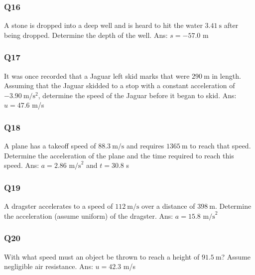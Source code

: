 \documentclass{article}
\begin{document}
\subsubsection{Q16}

A stone is dropped into a deep well and is heard to hit the water $3.41 \mathrm{~s}$ after being dropped. Determine the depth of the well.
\ifpaper Ans: $s=-57.0$ m \fi

\subsubsection{Q17}

It was once recorded that a Jaguar left skid marks that were $290 \mathrm{~m}$ in length. Assuming that the Jaguar skidded to a stop with a constant acceleration of $-3.90 \mathrm{~m} / \mathrm{s}^2$, determine the speed of the Jaguar before it began to skid.
\ifpaper Ans: $u=47.6$ m/s \fi

\subsubsection{Q18}


A plane has a takeoff speed of $88.3 \mathrm{~m} / \mathrm{s}$ and requires $1365 \mathrm{~m}$ to reach that speed. Determine the acceleration of the plane and the time required to reach this speed.
\ifpaper Ans: $a=2.86 \text{ m/s}^2$ and $t=30.8$ s \fi

\subsubsection{Q19}

A dragster accelerates to a speed of $112 \mathrm{~m} / \mathrm{s}$ over a distance of $398 \mathrm{~m}$. Determine the acceleration (assume uniform) of the dragster.
\ifpaper Ans: $a=15.8 \text{ m/s}^2$ \fi

\subsubsection{Q20}

With what speed must an object be thrown to reach a height of $91.5 \mathrm{~m}$? Assume negligible air resistance.
\ifpaper Ans: $u=42.3$ m/s \fi
\end{document}
